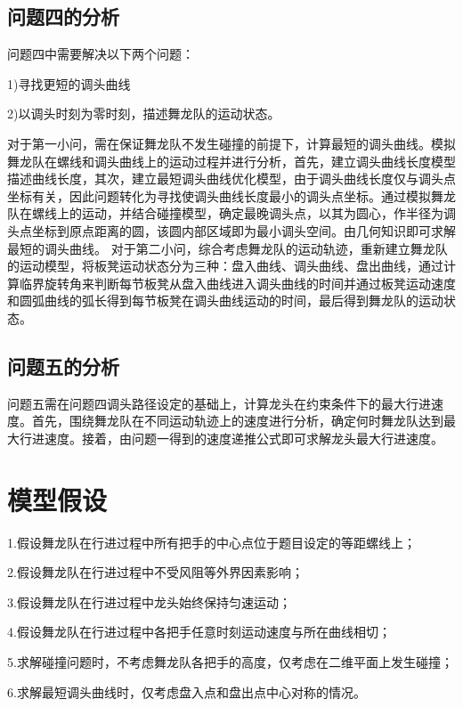 \documentclass[withoutpreface,bwprint]{cumcmthesis} %
\begin{document}
	\subsection{问题四的分析}
	问题四中需要解决以下两个问题：
	
	1)寻找更短的调头曲线
	
	2)以调头时刻为零时刻，描述舞龙队的运动状态。
	
	对于第一小问，需在保证舞龙队不发生碰撞的前提下，计算最短的调头曲线。模拟舞龙队在螺线和调头曲线上的运动过程并进行分析，首先，建立调头曲线长度模型描述曲线长度，其次，建立最短调头曲线优化模型，由于调头曲线长度仅与调头点坐标有关，因此问题转化为寻找使调头曲线长度最小的调头点坐标。通过模拟舞龙队在螺线上的运动，并结合碰撞模型，确定最晚调头点，以其为圆心，作半径为调头点坐标到原点距离的圆，该圆内部区域即为最小调头空间。由几何知识即可求解最短的调头曲线。
	对于第二小问，综合考虑舞龙队的运动轨迹，重新建立舞龙队的运动模型，将板凳运动状态分为三种：盘入曲线、调头曲线、盘出曲线，通过计算临界旋转角来判断每节板凳从盘入曲线进入调头曲线的时间并通过板凳运动速度和圆弧曲线的弧长得到每节板凳在调头曲线运动的时间，最后得到舞龙队的运动状态。
	
	\subsection{问题五的分析}	
	问题五需在问题四调头路径设定的基础上，计算龙头在约束条件下的最大行进速度。首先，围绕舞龙队在不同运动轨迹上的速度进行分析，确定何时舞龙队达到最大行进速度。接着，由问题一得到的速度递推公式即可求解龙头最大行进速度。
	\section{模型假设}	
	1.假设舞龙队在行进过程中所有把手的中心点位于题目设定的等距螺线上；
	
	2.假设舞龙队在行进过程中不受风阻等外界因素影响；
	
	3.假设舞龙队在行进过程中龙头始终保持匀速运动；
	
	4.假设舞龙队在行进过程中各把手任意时刻运动速度与所在曲线相切；
	
	5.求解碰撞问题时，不考虑舞龙队各把手的高度，仅考虑在二维平面上发生碰撞；
	
	6.求解最短调头曲线时，仅考虑盘入点和盘出点中心对称的情况。
	
	
	
\end{document}
